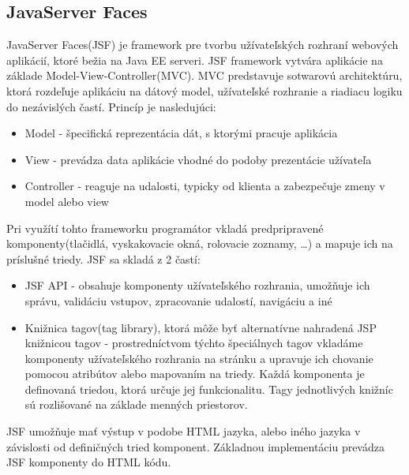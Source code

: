 \subsection{JavaServer Faces}\label{jsfkap}
JavaServer Faces(JSF) je framework pre tvorbu užívateľských rozhraní webových aplikácií, ktoré bežia na Java EE serveri. JSF framework vytvára aplikácie na základe  Model-View-Controller(MVC). MVC predstavuje sotwarovú architektúru, ktorá rozdeľuje aplikáciu na dátový model, užívateľské rozhranie a riadiacu logiku do nezávislých častí. Princíp je nasledujúci:
\begin{itemize}
\item Model - špecifická reprezentácia dát, s ktorými pracuje aplikácia
\item View - prevádza data aplikácie vhodné do podoby prezentácie užívateľa
\item Controller - reaguje na udalosti, typicky od klienta a zabezpečuje zmeny v model alebo view

\end{itemize}
Pri využítí tohto frameworku programátor vkladá predpripravené komponenty(tlačidlá, vyskakovacie okná, rolovacie zoznamy, \ldots) a mapuje ich na príslušné triedy. JSF sa skladá z 2 častí:
\begin{itemize}
\item JSF API - obsahuje komponenty užívateľského rozhrania, umožňuje ich správu, validáciu vstupov, zpracovanie udalostí, navigáciu a iné
\item Knižnica tagov(tag library), ktorá môže byť alternatívne nahradená JSP knižnicou tagov - prostredníctvom týchto špeciálnych tagov vkladáme komponenty užívateľského rozhrania na stránku a upravuje ich chovanie pomocou atribútov alebo mapovaním na triedy. Každá komponenta je definovaná triedou, ktorá určuje jej funkcionalitu. Tagy jednotlivých knižníc sú rozlišované na základe menných priestorov.
\end{itemize}

JSF umožňuje mať výstup v podobe HTML jazyka, alebo iného jazyka v závislosti od definičných tried komponent. Základnou implementáciu prevádza JSF komponenty do HTML kódu.

